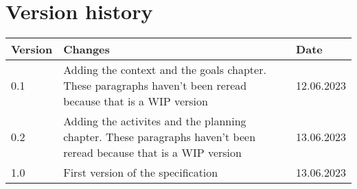 \chapter{Version history}
\label{chap:spec-versions}

\begin{tabular}{|m{}|m{}|m{}|}
 \hline
 \textbf{Version} & \textbf{Changes} & \textbf{Date} \\ [0.5ex]
 \hline
 0.1 & Adding the context and the goals chapter. These paragraphs haven't been reread because that is a WIP version & 12.06.2023  \\
 \hline
 0.2 & Adding the activites and the planning chapter. These paragraphs haven't been reread because that is a WIP version & 13.06.2023  \\
 \hline
 1.0 & First version of the specification & 13.06.2023  \\
 \hline
\end{tabular}
